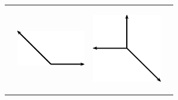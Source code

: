\begin{enumerate}[noitemsep, label=\textbf{\arabic*}. ]
\begin{center}
\begin{xtabular*}{\mytablewidth}[t]{|p{10\mystarwidth}|p{10\mystarwidth}|p{10\mystarwidth}|p{10\mystarwidth}|}
\begin{center}
    \end{center}



    \addtocounter{footnote}{-0}
     &
    
    
        
    \setcounter{subfigure}{0}

\label{m38819*id197132}
    \begin{center}
    \label{m38819*id197132!!!underscore!!!media}\label{m38819*id197132!!!underscore!!!printimage}\includegraphics[width=3cm]{col11305.imgs/m38819_PG11C1_075.png} %
        
      \vspace{2pt}
    \vspace{.1in}
    
    \end{center}



    \addtocounter{footnote}{-0}
     &
    
    
        
    \setcounter{subfigure}{0}

\label{m38819*id197143}
    \begin{center}
    \label{m38819*id197143!!!underscore!!!media}\label{m38819*id197143!!!underscore!!!printimage}\includegraphics[width=3cm]{col11305.imgs/m38819_PG11C1_076.png} %
        
      \vspace{2pt}
    \vspace{.1in}
    

\end{center}
\end{xtabular*}
\end{center}
\end{enumerate}
